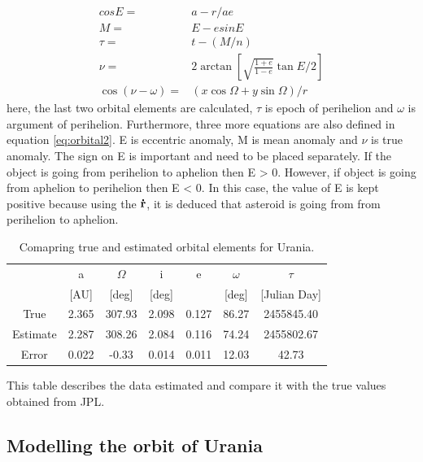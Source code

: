 \documentclass[a4paper,12pt]{article}
\begin{document}
\begin{equation}
\label{eq:orbital2}
\begin{array}{rl}
cos E =& a-r/ae\\
M =& E - e sin E \\
\tau =& t - (M/n) \\
\nu =& 2\arctan \left [ \sqrt{\frac{1+e}{1-e}} \tan E/2  \right ]\\
\cos(\nu - \omega) =& (x \cos \Omega + y \sin \Omega)/r
\end{array}
\end{equation}
here, the last two orbital elements are calculated, $\tau$ is epoch of perihelion and $\omega$ is argument of perihelion. Furthermore, three more equations are also defined in equation \ref{eq:orbital2}. E is eccentric anomaly, M is mean anomaly and $\nu$ is true anomaly. The sign on E is important and need to be placed separately. If the object is going from perihelion to aphelion then E > 0. However, if object is going from aphelion to perihelion then E < 0. In this case, the value of E is kept positive because using the $\bf{\dot{r}}$, it is deduced that asteroid is going from from perihelion to aphelion.


\begin{table}[H]
\centering %
\caption{Comapring true and estimated orbital elements for Urania.}
\footnotesize
\begin{tabular}{ccccccc}%
\hline
\hline
  & a & $\Omega$ & i & e & $\omega$ & $\tau$ \\
& [AU]&[deg] &[deg]&&[deg]&[Julian Day]\\
\hline
\hline
True    & 2.365& 307.93 &2.098& 0.127&86.27&2455845.40\\
Estimate& 2.287& 308.26 &2.084& 0.116&74.24&2455802.67\\
Error   & 0.022& -0.33  &0.014& 0.011&12.03&42.73\\
\hline
\hline
\end{tabular}
\label{table:elements} %
\end{table}
This table describes the data estimated and compare it with the true values obtained from JPL. 

\subsection{Modelling the orbit of Urania}
\end{document}
